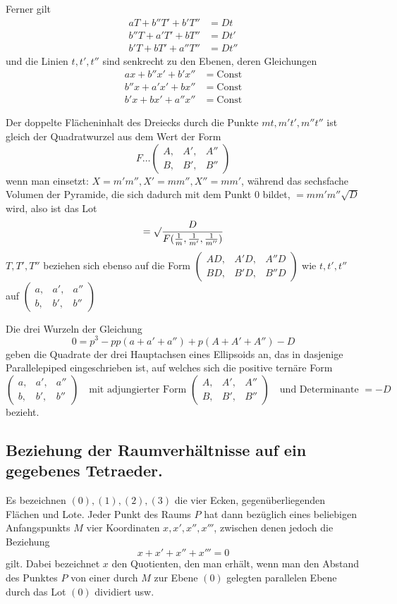 Ferner gilt
\[
\begin{aligned}
aT+b''T'+b'T''&=Dt\\
b''T+a'T'+bT''&=Dt'\\
b'T+bT'+a''T''&=Dt''
\end{aligned}
\]
und die Linien $t,t',t''$ sind senkrecht zu den Ebenen, deren Gleichungen
\[
\begin{aligned}
ax+b''x'+b'x''&=\mathrm{Const}\\
b''x+a'x'+bx''&=\mathrm{Const}\\
b'x+bx'+a''x''&=\mathrm{Const}
\end{aligned}
\]

Der doppelte Flächeninhalt des Dreiecks durch die Punkte $mt,m't',m''t''$ ist gleich der Quadratwurzel aus dem Wert der Form
\[
F\ldots\left(\begin{smallmatrix}A,&A',&A''\\B,&B',&B''\end{smallmatrix}\right)
\]
wenn man einsetzt: $X=m'm'',X'=mm'',X''=mm'$, während das sechsfache Volumen der Pyramide, die sich dadurch mit dem Punkt $0$ bildet, $=mm'm''\surd D$ wird, also ist das Lot
\[
=\surd\frac{D}{F(\frac1m,\frac1{m'},\frac1{m''})}
\]
$T,T',T''$ beziehen sich ebenso auf die Form $\left(\begin{smallmatrix}AD,&A'D,&A''D\\BD,&B'D,&B''D\end{smallmatrix}\right)$ wie $t,t',t''$ auf $\left(\begin{smallmatrix}a,&a',&a''\\b,&b',&b''\end{smallmatrix}\right)$

Die drei Wurzeln der Gleichung
\[
0=p^3-pp(a+a'+a'')+p(A+A'+A'')-D
\]
geben die Quadrate der drei Hauptachsen eines Ellipsoids an, das in dasjenige Parallelepiped eingeschrieben ist, auf welches sich die positive ternäre Form
\[
\left(\begin{smallmatrix}a,&a',&a''\\b,&b',&b''\end{smallmatrix}\right)
\quad\text{mit adjungierter Form }\left(\begin{smallmatrix}A,&A',&A''\\B,&B',&B''\end{smallmatrix}\right)
\quad\text{und Determinante }=-D
\]
bezieht.

\subsection*{Beziehung der Raumverhältnisse auf ein gegebenes Tetraeder.}
Es bezeichnen $(0),(1),(2),(3)$ die vier Ecken, gegenüberliegenden Flächen und Lote. Jeder Punkt des Raums $P$ hat dann bezüglich eines beliebigen Anfangspunkts $M$ vier Koordinaten $x,x',x'',x'''$, zwischen denen jedoch die Beziehung
\[
x+x'+x''+x'''=0
\]
gilt. Dabei bezeichnet $x$ den Quotienten, den man erhält, wenn man den Abstand des
Punktes $P$ von einer durch $M$ zur Ebene $(0)$ gelegten parallelen Ebene durch das Lot $(0)$ dividiert usw.

